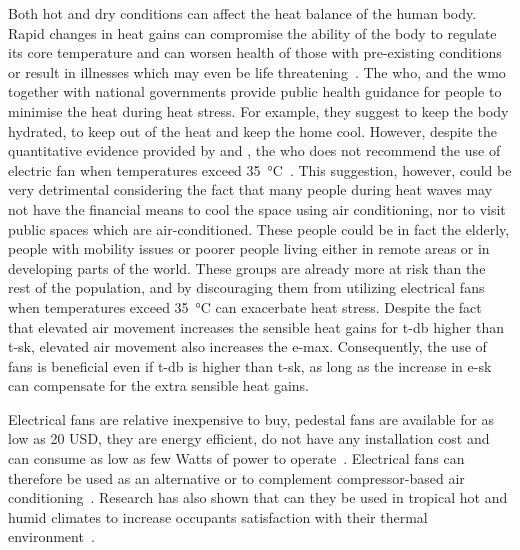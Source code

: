 Both hot and dry conditions can affect the heat balance of the human body.
Rapid changes in heat gains can compromise the ability of the body to regulate its core temperature and can worsen health of those with pre-existing conditions or result in illnesses which may even be life threatening~\cite{WMO2015}.
The \ac{who}, and the \ac{wmo} together with national governments provide public health guidance for people to minimise the heat during heat stress.
For example, they suggest to keep the body hydrated, to keep out of the heat and keep the home cool.
However, despite the quantitative evidence provided by  and , the \ac{who} does not recommend the use of electric fan when temperatures exceed 35~°C~\cite{HeatandH28:online, WMO2015}.
This suggestion, however, could be very detrimental considering the fact that many people during heat waves may not have the financial means to cool the space using air conditioning, nor to visit public spaces which are air-conditioned.
These people could be in fact the elderly, people with mobility issues or poorer people living either in remote areas or in developing parts of the world.
These groups are already more at risk than the rest of the population, and by discouraging them from utilizing electrical fans when temperatures exceed 35~°C can exacerbate heat stress.
Despite the fact that elevated air movement increases the sensible heat gains for \ac{t-db} higher than \ac{t-sk}, elevated air movement also increases the \ac{e-max}.
Consequently, the use of fans is beneficial even if \ac{t-db} is higher than \ac{t-sk}, as long as the increase in \ac{e-sk} can compensate for the extra sensible heat gains.

Electrical fans are relative inexpensive to buy, pedestal fans are available for as low as 20 USD, they are energy efficient, do not have any installation cost and can consume as low as few Watts of power to operate~\cite{Yang2015a, Lipczynska2018a, Jay2019a}.
Electrical fans can therefore be used as an alternative or to complement compressor-based air conditioning~\cite{Yang2015a, Lipczynska2018a, Jay2019a}.
Research has also shown that can they be used in tropical hot and humid climates to increase occupants satisfaction with their thermal environment~\cite{Lipczynska2018a}.

